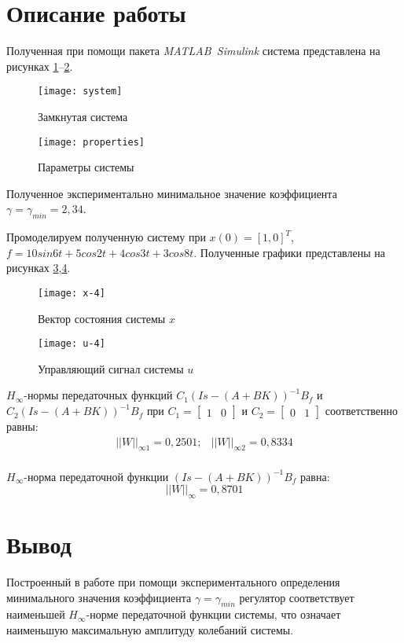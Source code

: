 \documentclass[14pt, a4paper]{extarticle}
\begin{document}
	\newpage
	
	\section*{Описание работы}
	
	Полученная при помощи пакета \textit{MATLAB~Simulink} система представлена на рисунках \ref{fig:system}--\ref{fig:properties}.
	
	\begin{figure}[H]
		\centering
		\texttt{[image: system]}
		\caption{Замкнутая система}
		\label{fig:system}
	\end{figure}
	
	\begin{figure}[H]
		\centering
		\texttt{[image: properties]}
		\caption{Параметры системы}
		\label{fig:properties}
	\end{figure}
	
	Полученное экспериментально минимальное значение коэффициента $\gamma=\gamma_{min}=2,34$.
	
	Промоделируем полученную систему при $x(0)=[1,0]^T$, $f=10sin6t+5cos2t+4cos3t+3cos8t$. Полученные графики представлены на рисунках \ref{fig:x-4},\ref{fig:u-4}.
	
	\begin{figure}[H]
		\centering
		\texttt{[image: x-4]}
		\caption{Вектор состояния системы $x$}
		\label{fig:x-4}
	\end{figure}
	
	\begin{figure}[H]
		\centering
		\texttt{[image: u-4]}
		\caption{Управляющий сигнал системы $u$}
		\label{fig:u-4}
	\end{figure}
	
	$H_\infty$-нормы передаточных функций $C_1(Is-(A+BK))^{-1}B_f$ и $C_2(Is-(A+BK))^{-1}B_f$ при $C_1=\left[\begin{matrix}1 & 0\end{matrix}\right]$ и $C_2=\left[\begin{matrix}0 & 1\end{matrix}\right]$ соответственно равны:
	$$\begin{matrix}
		\left|\left|W\right|\right|_{\infty1} = 0,2501; & \left|\left|W\right|\right|_{\infty2} = 0,8334 \\
	\end{matrix}$$
	
	$H_\infty$-норма передаточной функции $(Is-(A+BK))^{-1}B_f$ равна:
	$$\left|\left|W\right|\right|_\infty=0,8701$$
	
	\newpage
	
	\section*{Вывод}
	
	Построенный в работе при помощи экспериментального определения минимального значения коэффициента $\gamma=\gamma_{min}$ регулятор соответствует наименьшей $H_\infty$-норме передаточной функции системы, что означает наименьшую максимальную амплитуду колебаний системы.
\end{document}
